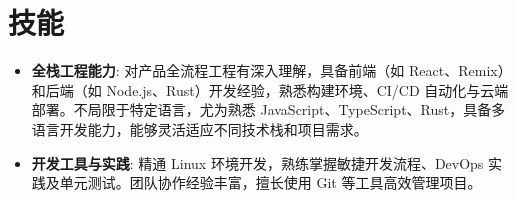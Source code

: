 \documentclass{resume}
\newcommand{\en}[1]{}
\newcommand{\zh}[1]{#1}
\begin{document}
\section{\en{Skills}\zh{技能}}
\begin{itemize}[parsep=0.25ex]
      \item \en{\textbf{Full-Stack Engineering}: Comprehensive understanding of the complete product engineering lifecycle with hands-on experience in frontend technologies (React, Remix) and backend development (Node.js, Rust). Proficient in build tooling, CI/CD automation, and cloud deployment strategies. Language-agnostic approach with deep expertise in JavaScript, TypeScript, and Rust—highly adaptable to diverse tech stacks and project requirements.}
            \zh{\textbf{全栈工程能力}: 对产品全流程工程有深入理解，具备前端（如 React、Remix）和后端（如 Node.js、Rust）开发经验，熟悉构建环境、CI/CD 自动化与云端部署。不局限于特定语言，尤为熟悉 JavaScript、TypeScript、Rust，具备多语言开发能力，能够灵活适应不同技术栈和项目需求。}
      \item \en{\textbf{Development Tools \& Practices}: Expert-level proficiency in Linux development environments, agile development methodologies, DevOps practices, and comprehensive testing strategies. Extensive collaborative development experience with advanced Git workflow management for efficient project coordination.}
            \zh{\textbf{开发工具与实践}: 精通 Linux 环境开发，熟练掌握敏捷开发流程、DevOps 实践及单元测试。团队协作经验丰富，擅长使用 Git 等工具高效管理项目。}
\end{itemize}
\end{document}
